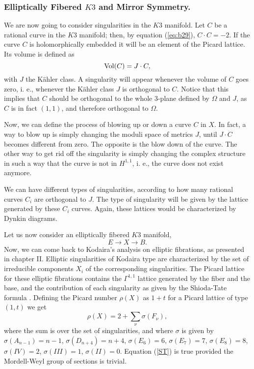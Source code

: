 \subsubsection{Elliptically Fibered $K3$ and Mirror Symmetry.}

We are now going to consider singularities in the $K3$ manifold. 
Let $C$ be a rational curve in the $K3$ manifold; then, by equation
(\ref{eq:b29}), $C \cdot C=-2$. If the curve $C$ is holomorphically embedded it 
will be an element of the Picard lattice. Its volume is defined
as 
\begin{equation}
\hbox {Vol} (C) = J \cdot C,
\label{eq:b34}
\end{equation}
with $J$ the K\"ahler class. A singularity will appear whenever
the volume of $C$ goes zero, i. e., whenever the K\"ahler class
$J$ is orthogonal to $C$. Notice that this implies that $C$
should be orthogonal to the whole $3$-plane defined by $\Omega$
and $J$, as $C$ is in fact $(1,1)$, and therefore orthogonal to
$\Omega$.
  
Now, we can define the process of blowing up or down a curve $C$
in $X$. In fact, a way to blow up is simply changing the moduli
space of metrics $J$, until $J \cdot C$ becomes different from
zero. The opposite is the blow down of the curve. The other way
to get rid off the singularity is simply changing the complex
structure in such a way that the curve is not in 
$H^{1,1}$, i. e., the curve does not exist anymore.
  
We can have different types of singularities, according to how
many rational curves $C_i$ are orthogonal to $J$. The type of
singularity will be given by the lattice generated by these $C_i$
curves. Again, these lattices would be characterized by Dynkin
diagrams. 
  
Let us now consider an elliptically fibered $K3$ manifold,
\begin{equation}
E \rightarrow X \rightarrow B.
\end{equation}
Now, we can come back to Kodaira's analysis on elliptic
fibrations, as presented in chapter II. Elliptic singularities of
Kodaira type are characterized by the set of irreducible
components $X_i$ of the corresponding singularities. The Picard
lattice for these elliptic fibrations contains the $\Gamma^{1,1}$
lattice generated by the fiber and the base, and the
contribution of each singularity as given by the Shioda-Tate
formula \cite{Dolgachev}. Defining the Picard number $\rho(X)$ as $1+t$ for a
Picard lattice of type $(1,t)$ we get
\begin{equation}
\rho(X) = 2 + \sum_{\nu} \sigma(F_{\nu}),
\label{ST}
\end{equation}
where the sum is over the set of singularities, and where
$\sigma$ is given by $\sigma(A_{n-1})=n-1$, $\sigma(D_{n+4})=n+4$,
$\sigma(E_6)=6$, $\sigma(E_7)=7$, $\sigma(E_8)=8$, $\sigma(IV)=2$,
$\sigma(III)=1$, $\sigma(II)=0$. Equation (\ref{ST}) is true
provided the Mordell-Weyl group of sections is trivial.
 
